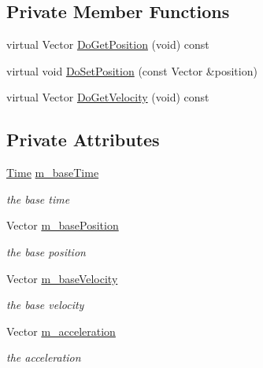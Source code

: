 \subsection*{Private Member Functions}
\begin{DoxyCompactItemize}
\item 
virtual Vector \hyperlink{classns3_1_1ConstantAccelerationMobilityModel_a403651b388d398b5b4798f8c647ec1c0}{Do\+Get\+Position} (void) const 
\item 
virtual void \hyperlink{classns3_1_1ConstantAccelerationMobilityModel_aecb88ce81b31454da0c65746de1763a6}{Do\+Set\+Position} (const Vector \&position)
\item 
virtual Vector \hyperlink{classns3_1_1ConstantAccelerationMobilityModel_afc8462ad483a06ce76dc81527b63e21d}{Do\+Get\+Velocity} (void) const 
\end{DoxyCompactItemize}
\subsection*{Private Attributes}
\begin{DoxyCompactItemize}
\item 
\hyperlink{classns3_1_1Time}{Time} \hyperlink{classns3_1_1ConstantAccelerationMobilityModel_abae468b93d91aa5d58d1f8bd87bdd3ad}{m\+\_\+base\+Time}
\begin{DoxyCompactList}\small\item\em the base time \end{DoxyCompactList}\item 
Vector \hyperlink{classns3_1_1ConstantAccelerationMobilityModel_a224b67b17c174a5b54a76342193f347a}{m\+\_\+base\+Position}
\begin{DoxyCompactList}\small\item\em the base position \end{DoxyCompactList}\item 
Vector \hyperlink{classns3_1_1ConstantAccelerationMobilityModel_ad6271f0bacfbbf877887232c477d06f7}{m\+\_\+base\+Velocity}
\begin{DoxyCompactList}\small\item\em the base velocity \end{DoxyCompactList}\item 
Vector \hyperlink{classns3_1_1ConstantAccelerationMobilityModel_a7890737c1d5ac182abfcf3316bbbefa2}{m\+\_\+acceleration}
\begin{DoxyCompactList}\small\item\em the acceleration \end{DoxyCompactList}\end{DoxyCompactItemize}
